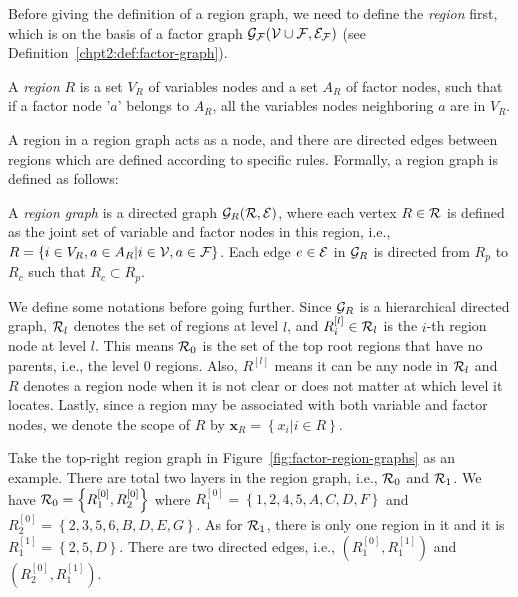 Before giving the definition of a region graph, we need to define the \textit{region} first, which is on the basis of a factor graph $\mathcal{G}_{\mathcal{F}}(\mathcal{V} \cup \mathcal{F}, \mathcal{E}_{\mathcal{F}})$ (see Definition~\ref{chpt2:def:factor-graph}).
\begin{definition}
  A \textit{region} $R$ is a set $V_R$ of variables nodes and a set $A_R$ of factor nodes, such that if a factor node '$a$' belongs to $A_R$, all the variables nodes neighboring $a$ are in $V_R$.
\end{definition}
A region in a region graph acts as a node, and there are directed edges between regions which are defined according to specific rules. Formally, a region graph is defined as follows:
\begin{definition}\label{def:region-graph}
  A \textit{region graph} is  a directed graph $\mathcal{G}_R(\mathcal{R}, \mathcal{E})$, where each vertex $R \in \mathcal{R}$ is defined as the joint set of variable and factor nodes in this region, i.e., $R = \left\{ i \in V_R, a \in A_R | i \in \mathcal{V}, a \in \mathcal{F} \right\}$. Each edge $e \in \mathcal{E}$ in $\mathcal{G}_R$ is directed from $R_p$ to $R_c$ such that $R_c \subset R_p$. 
\end{definition}


We define some notations before going further. Since $\mathcal{G}_R$ is a hierarchical directed graph, $\mathcal{R}_l$ denotes the set of regions at level $l$, and
$R^{[l]}_i\in \mathcal{R}_l$ is the $i$-th region node at level $l$. This means $\mathcal{R}_0$ is the set of the top root regions that have no parents, i.e., the level $0$ regions. Also, $R^{[l]}$ means it can be any node in $\mathcal{R}_l$ and $R$ denotes a region node when it is not clear or does not matter at which level it locates. Lastly, since a region may be associated with both variable and factor nodes, we denote the scope of $R$ by  $\bm{x}_R = \left\{ x_i| i \in R \right\}$.

\begin{example}
  Take the top-right region graph in Figure~\ref{fig:factor-region-graphs} as an example. There are total two layers in the region graph, i.e., $\mathcal{R}_0$ and $\mathcal{R}_1$. We have $\mathcal{R}_0 = \left\{ R_1^{[0]}, R_2^{[0]} \right\}$ where $R_1^{[0]} = \left\{ 1, 2, 4, 5, A, C, D, F \right\}$ and $R_2^{[0]} = \left\{ 2, 3, 5, 6, B, D, E, G \right\}$. As for $\mathcal{R}_1$, there is only one region in it and it is $R_1^{[1]} = \left\{ 2, 5, D \right\}$. There are two directed edges, i.e., $\left( R_1^{[0]}, R_1^{[1]} \right)$ and $\left( R_2^{[0]}, R_1^{[1]} \right)$.
\end{example}

